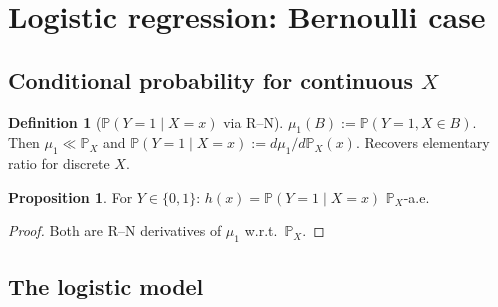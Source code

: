 \documentclass[12pt, a4paper]{article}
\theoremstyle{definition}
\newtheorem{definition}{Definition}[section]
\newtheorem{proposition}{Proposition}[section]
\newcommand{\Prob}{\mathbb{P}}
\begin{document}
\section{Logistic regression: Bernoulli case}

\subsection{Conditional probability for continuous $X$}

\begin{center}
\end{center}

\begin{definition}[$\Prob(Y=1\mid X=x)$ via R--N]\label{def:condprob}
$\mu_1(B):=\Prob(Y=1,X\in B)$. Then $\mu_1\ll\Prob_X$ and
$\Prob(Y=1\mid X=x):=d\mu_1/d\Prob_X(x)$.
Recovers elementary ratio for discrete $X$.
\end{definition}

\begin{proposition}\label{prop:bern}
For $Y\in\{0,1\}$: $h(x)=\Prob(Y=1\mid X=x)$ $\Prob_X$-a.e.
\end{proposition}
\begin{proof}
Both are R--N derivatives of $\mu_1$ w.r.t.\ $\Prob_X$.
\end{proof}

\subsection{The logistic model}
\end{document}
